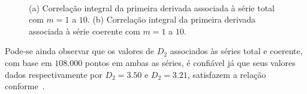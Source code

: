 \begin{figure}[ht]
\centering {}\\ 
\caption{(a) Correlação integral da primeira derivada associada à série total com $m=1$ a $10$. (b) Correlação integral da primeira derivada associada à série coerente com $m=1$ a $10$.}
\label{figtS0681200diff}
\end{figure}

Pode-se ainda observar que os valores de $D_{2}$ associados às séries total e coerente, com base em $108.000$ pontos em ambas as séries, é confiável já que seus valores dados respectivamente por $D_{2}=3.50$ e $D_{2}=3.21$, satisfazem a relação%
conforme~.

